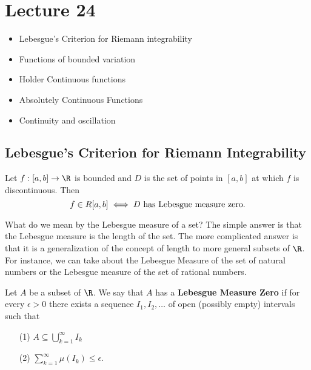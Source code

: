 \section{Lecture 24}

\begin{itemize}
    \item Lebesgue's Criterion for Riemann integrability
    \item Functions of bounded variation
    \item Holder Continuous functions
    \item Absolutely Continuous Functions
    \item Continuity and oscillation
\end{itemize}

\subsection{Lebesgue's Criterion for Riemann Integrability}

\begin{theorem}
    Let \( f: [a,b] \to \R   \) is bounded and \( D  \) is the set of points in \( [a,b] \) at which \( f  \) is discontinuous. Then 
    \[  f \in R[a,b] \iff \text{\( D  \) has Lebesgue measure zero}. \]
\end{theorem}

What do we mean by the Lebesgue measure of a set? The simple answer is that the Lebesgue measure is the length of the set. The more complicated answer is that it is a generalization of the concept of length to more general subsets of \( \R  \). For instance, we can take about the Lebesgue Measure of the set of natural numbers or the Lebesgue measure of the set of rational numbers. 

\begin{definition}
    Let \( A  \) be a subset of \( \R  \). We say that \( A  \) has a \textbf{Lebesgue Measure Zero} if for every \( \epsilon > 0  \) there exists a sequence \( {I}_{1}, {I}_{2}, \dots  \) of open (possibly empty) intervals such that  
    \begin{enumerate}
        \item[(1)] \( A \subseteq  \bigcup_{ k = 1  }^{ \infty  }  {I}_{k } \)
        \item[(2)] \( \displaystyle \sum_{ k=1  }^{ \infty  } \mu({I}_{k}) \leq \epsilon \).
    \end{enumerate}
\end{definition}

